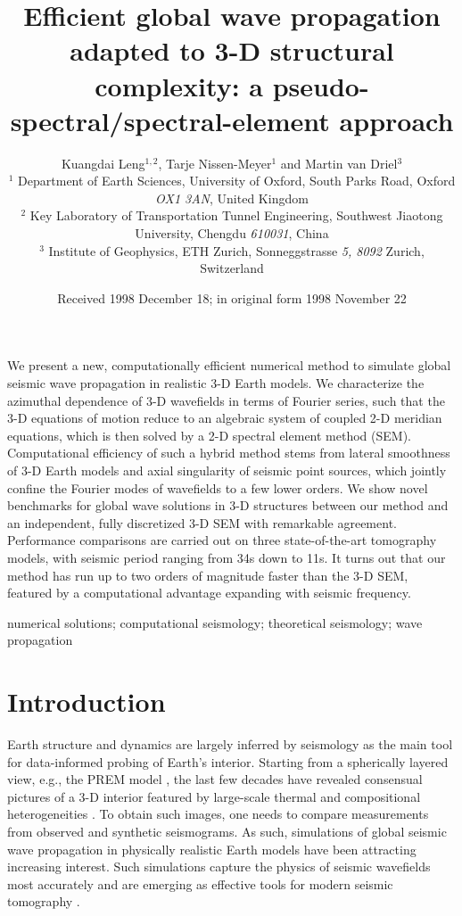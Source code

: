 \documentclass[extra]{gji}
\title[Waves in 3-D Earth]
  {Efficient global wave propagation adapted to 3-D structural complexity: 
  a pseudo-spectral/spectral-element approach}
\author[K Leng et al.]
  {Kuangdai Leng$^{1, 2}$, Tarje Nissen-Meyer$^1$ and Martin van Driel$^3$\\
  $^1$ Department of Earth Sciences, University of Oxford, South Parks Road,
  Oxford \emph{OX1 3AN}, United Kingdom\\
  $^2$ Key Laboratory of Transportation Tunnel Engineering, Southwest Jiaotong University, 
  Chengdu \emph{610031}, China\\
  $^3$ Institute of Geophysics, ETH Zurich, 
  Sonneggstrasse \emph{5, 8092} Zurich, Switzerland}
\date{Received 1998 December 18; in original form 1998 November 22}
\begin{document}
\label{firstpage}
\maketitle


\begin{summary}
  We present a new, computationally efficient numerical method to
  simulate global seismic wave propagation in realistic 3-D Earth models.
%   
  We characterize the azimuthal dependence of 3-D wavefields in 
  terms of Fourier series, such that the 3-D equations of motion reduce to 
  an algebraic system of coupled 2-D meridian equations, 
  which is then solved by a 2-D spectral element method (SEM).
%   
  Computational efficiency of such a hybrid method stems from 
  lateral smoothness of 3-D Earth models and axial singularity of seismic point sources, 
  which jointly confine the Fourier modes of wavefields to a few lower orders. 
%  
  We show novel benchmarks for global wave solutions in 3-D structures 
  between our method and an independent, fully discretized 3-D SEM
  with remarkable agreement.
%  
  Performance comparisons are carried out on three state-of-the-art tomography 
  models, with seismic period ranging from 34s down to 11s.
%   
  It turns out that our method has run up to two orders of magnitude faster than the 
  3-D SEM, featured by a computational advantage expanding with seismic frequency. 
\end{summary}

\begin{keywords}
  numerical solutions; computational seismology; theoretical seismology; 
  wave propagation
\end{keywords}

\section{Introduction}
Earth structure and dynamics are largely inferred by seismology 
as the main tool for data-informed probing of Earth's interior. 
Starting from a spherically layered view, e.g., 
the PREM model \cite[]{dziewonski1981prem}, 
the last few decades have revealed consensual pictures of a 3-D
interior featured by large-scale thermal and compositional heterogeneities 
\cite[]{becker2002comparison}.
To obtain such images, one needs to compare measurements from observed and synthetic seismograms. 
As such, simulations of global seismic wave propagation in physically realistic 
Earth models have been attracting increasing interest. 
Such simulations capture the physics of seismic wavefields  
most accurately and are emerging as effective tools for 
modern seismic tomography \cite[]{tromp2005seismic, 
nolet2008breviary, rawlinson2010seismic}.
\end{document}
